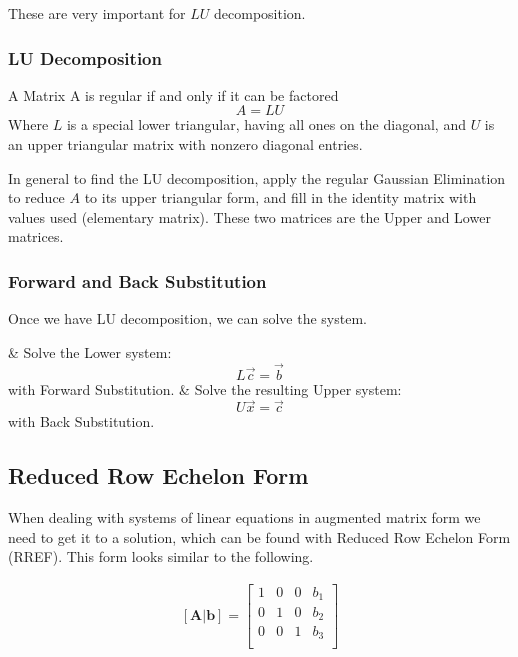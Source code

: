     These are very important for $LU$ decomposition.

        \subsubsection{LU Decomposition}
        \begin{thm}
            A Matrix A is regular if and only if it can be factored
            \[ A = LU \]
            Where $L$ is a special lower triangular, having all ones on the diagonal, and $U$ is an upper triangular matrix with nonzero diagonal entries.
        \end{thm}

        In general to find the LU decomposition, apply the regular Gaussian Elimination to reduce $A$ to its upper triangular form, and fill in the identity matrix with values used (elementary matrix). These two matrices are the Upper and Lower matrices.

        \subsubsection{Forward and Back Substitution}
        Once we have LU decomposition, we can solve the system.

        \NewList
        \begin{easylist}[enumerate]
            & Solve the Lower system:
                \[ L \vec{c} = \vec{b} \]
                with Forward Substitution.
            & Solve the resulting Upper system:
                \[ U \vec{x} = \vec{c} \]
                with Back Substitution.
        \end{easylist}


    \subsection{Reduced Row Echelon Form}\label{sec:RREF}
    When dealing with systems of linear equations in augmented matrix form we need to get it to a solution, which can be found with Reduced Row Echelon Form (RREF). This form looks similar to the following.

    \begin{equation}\label{eq:rref}
    \begin{aligned}
        \mathbf{[A|b]}=
        \left[\begin{array}{ccc|c}
        1 & 0 & 0 & b_1\\
        0 & 1 & 0 & b_2\\
        0 & 0 & 1 & b_3\\
        \end{array}\right]\\
    \end{aligned}
    \end{equation}

